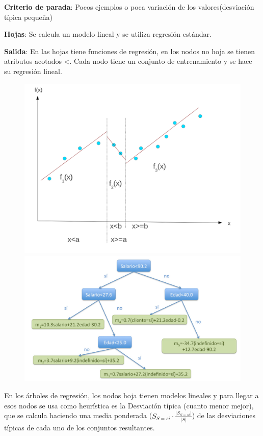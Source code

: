 \documentclass[12pt]{report} %
\begin{document}
\textbf{Criterio de parada}: Pocos ejemplos o poca variación de los
valores(desviación típica pequeña)

\textbf{Hojas}: Se calcula un modelo lineal y se utiliza regresión
estándar.

\textbf{Salida}: En las hojas tiene funciones de regresión, en los nodos
no hoja se tienen atributos acotados \textless. Cada nodo tiene un
conjunto de entrenamiento y se hace su regresión lineal.

\begin{figure}[H]
	{\includegraphics[scale=.2]{image-20210305230339091.png}
	\includegraphics[scale=.15]{image-20210305230601935.png}}
\end{figure}
En los árboles de regresión, los nodos hoja tienen modelos lineales y
para llegar a esos nodos se usa como heurística es la Desviación típica
(cuanto menor mejor), que se calcula haciendo una media ponderada
(\(S_{S=si}\cdot\frac {|S_{S=si}|}{|S|}\)) de las desviaciones típicas
de cada uno de los conjuntos resultantes.
\end{document}
